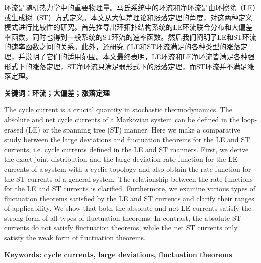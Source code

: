 
\setcounter{page}{1}
\song{}

环流是随机热力学中的重要物理量。马氏系统中的环流和净环流是由环擦除（LE）或生成树（ST）方式定义。本文从大偏差理论和涨落定理的角度，对这两种定义模式进行比较性的研究。首先推导出环拓扑结构系统的LE环流联合分布和大偏差率函数，同时也得到一般系统的ST环流的速率函数。然后我们阐明了LE和ST环流的速率函数之间的关系。此外，还研究了LE和ST环流满足的各种类型的涨落定理，并说明了它们的适用范围。本文最终表明，LE环流和LE净环流皆满足各种强形式下的涨落定理，ST净环流只满足弱形式下的涨落定理，而ST环流并不满足涨落定理。

\vspace{\baselineskip}

\hangindent=52.3pt\noindent
{\bfseries\xiaosi\song 关键词：环流；大偏差；涨落定理}
\clearpage


The cycle current is a crucial quantity in stochastic thermodynamics. The absolute and net cycle currents of a Markovian system can be defined in the loop-erased (LE) or the spanning tree (ST) manner. Here we make a comparative study between the large deviations and fluctuation theorems for the LE and ST currents, i.e. cycle currents defined in the LE and ST manners. First, we derive the exact joint distribution and the large deviation rate function for the LE currents of a system with a cyclic topology and also obtain the rate function for the ST currents of a general system. The relationship between the rate functions for the LE and ST currents is clarified. Furthermore, we examine various types of fluctuation theorems satisfied by the LE and ST currents and clarify their ranges of applicability. We show that both the absolute and net LE currents satisfy the strong form of all types of fluctuation theorems. In contrast, the absolute ST currents do not satisfy fluctuation theorems, while the net ST currents only satisfy the weak form of fluctuation theorems.

\vspace{\baselineskip}

\hangindent=60pt\noindent
{\textbf{\xiaosi Keywords: cycle currents, large deviations, fluctuation theorems}}
\clearpage
